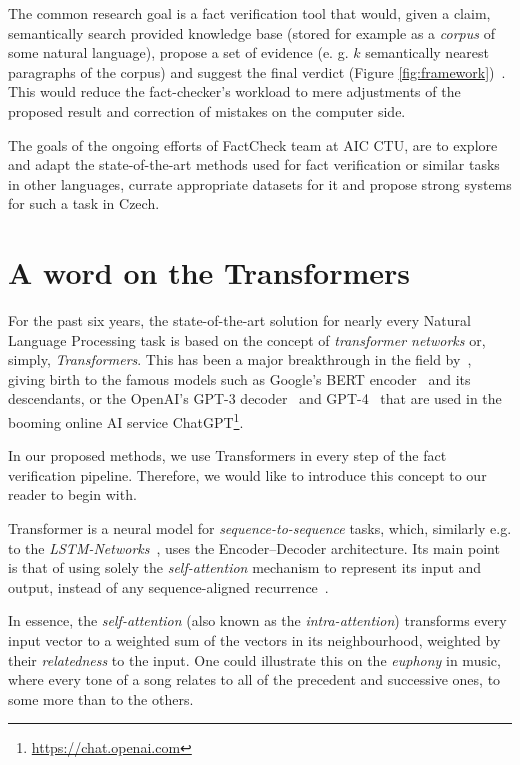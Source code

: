 The common research goal is a fact verification tool that would, given a claim, semantically search provided knowledge base (stored for example as a \textit{corpus} of some natural language), propose a set of evidence (e. g. $k$ semantically nearest paragraphs of the corpus) and suggest the final verdict (Figure \ref{fig:framework})~\cite{guo-etal-2022-survey}. This would reduce the fact-checker's workload to mere adjustments of the proposed result and correction of mistakes on the computer side. 

The goals of the ongoing efforts of {\textsf{FactCheck}} team at {\textsf{AIC CTU}}, are to explore and adapt the state-of-the-art methods used for fact verification or similar tasks in other languages, currate appropriate datasets for it and propose strong systems for such a task in Czech.


\section{A word on the Transformers}
\label{sec:transformers}
For the past six years, the state-of-the-art solution for nearly every Natural Language Processing task is based on the concept of \textit{transformer networks} or, simply, \textit{Transformers}. This has been a major breakthrough in the field by~\cite{vaswani}, giving birth to the famous models such as \textsf{Google}'s \textsf{BERT} encoder~\cite{devlin2019bert} and its descendants, or the \textsf{OpenAI}'s \textsf{GPT-3} decoder~\cite{gpt3} and \textsf{GPT-4}~\cite{gpt4} that are used in the booming online AI service \textsf{ChatGPT}\footnote{\url{https://chat.openai.com}}.

In our proposed methods, we use Transformers in every step of the fact verification pipeline. Therefore, we would like to introduce this concept to our reader to begin with. 

Transformer is a neural model for \textit{sequence-to-sequence} tasks, which, similarly e.g. to the \textit{LSTM-Networks}~\cite{lstm}, uses the Encoder--Decoder architecture. Its main point is that of using solely the \textit{self-attention} mechanism to represent its input and output, instead of any sequence-aligned recurrence~\cite{vaswani}.

In essence, the \textit{self-attention} (also known as the \textit{intra-attention}) transforms every input vector to a weighted sum of the vectors in its neighbourhood, weighted by their \textit{relatedness} to the input. One could illustrate this on the \textit{euphony} in music, where every tone of a song relates to all of the precedent and successive ones, to some more than to the others.

